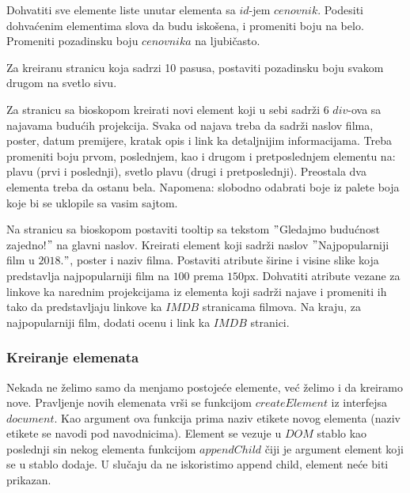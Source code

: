 \begin{primer}
Dohvatiti sve elemente liste unutar elementa sa $id$-jem $cenovnik$. Podesiti dohvaćenim elementima slova da budu iskošena, i promeniti boju na belo. Promeniti pozadinsku boju $cenovnika$ na ljubičasto.
\end{primer}

\begin{primer}
Za kreiranu stranicu koja sadrzi 10 pasusa, postaviti pozadinsku boju svakom drugom na svetlo sivu.
\end{primer}

\begin{primer}
Za stranicu sa bioskopom kreirati novi element koji u sebi sadrži 6 $div$-ova sa najavama budućih projekcija. Svaka od najava treba da sadrži naslov filma, poster, datum premijere, kratak opis i link ka detaljnijim informacijama. Treba promeniti boju prvom, poslednjem, kao i drugom i pretposlednjem elementu na: plavu (prvi i poslednji), svetlo plavu (drugi i pretposlednji). Preostala dva elementa treba da ostanu bela. Napomena: slobodno odabrati boje iz palete boja koje bi se uklopile sa vasim sajtom.   
\end{primer}

\begin{primer}
Na stranicu sa bioskopom postaviti tooltip sa tekstom $"$Gledajmo budućnost zajedno!$"$ na glavni naslov. Kreirati element koji sadrži naslov $"$Najpopularniji film u $2018$.$"$, poster i naziv filma. Postaviti atribute širine i visine slike koja predstavlja najpopularniji film na $100$ prema $150$px. Dohvatiti atribute vezane za linkove ka narednim projekcijama iz elementa koji sadrži najave i promeniti ih tako da predstavljaju linkove ka $IMDB$ stranicama filmova. Na kraju, za najpopularniji film, dodati ocenu i link ka $IMDB$ stranici.  
\end{primer}
\newpage

\subsubsection{Kreiranje elemenata}
Nekada ne želimo samo da menjamo postojeće elemente, već želimo i da kreiramo nove. Pravljenje novih elemenata vrši se funkcijom $createElement$ iz interfejsa $document$. Kao argument ova funkcija prima naziv etikete novog elementa (naziv etikete se navodi pod navodnicima). Element se vezuje u $DOM$ stablo kao poslednji sin nekog elementa funkcijom $appendChild$ čiji je argument element koji se u stablo dodaje. U slučaju da ne iskoristimo append child, element neće biti prikazan.

